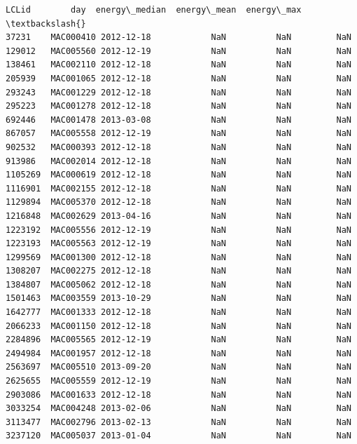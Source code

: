 \documentclass[11pt]{article}
\makeatletter
\newcommand{\boxspacing}{\kern\kvtcb@left@rule\kern\kvtcb@boxsep}
\newcommand{\prompt}[4]{
        {\ttfamily\llap{{\color{#2}[#3]:\hspace{3pt}#4}}\vspace{-\baselineskip}}
    }
\makeatother
\begin{document}
            \begin{tcolorbox}[breakable, size=fbox, boxrule=.5pt, pad at break*=1mm, opacityfill=0]
\prompt{Out}{outcolor}{30}{\boxspacing}
\begin{Verbatim}[commandchars=\\\{\}]
             LCLid        day  energy\_median  energy\_mean  energy\_max  \textbackslash{}
37231    MAC000410 2012-12-18            NaN          NaN         NaN
129012   MAC005560 2012-12-19            NaN          NaN         NaN
138461   MAC002110 2012-12-18            NaN          NaN         NaN
205939   MAC001065 2012-12-18            NaN          NaN         NaN
293243   MAC001229 2012-12-18            NaN          NaN         NaN
295223   MAC001278 2012-12-18            NaN          NaN         NaN
692446   MAC001478 2013-03-08            NaN          NaN         NaN
867057   MAC005558 2012-12-19            NaN          NaN         NaN
902532   MAC000393 2012-12-18            NaN          NaN         NaN
913986   MAC002014 2012-12-18            NaN          NaN         NaN
1105269  MAC000619 2012-12-18            NaN          NaN         NaN
1116901  MAC002155 2012-12-18            NaN          NaN         NaN
1129894  MAC005370 2012-12-18            NaN          NaN         NaN
1216848  MAC002629 2013-04-16            NaN          NaN         NaN
1223192  MAC005556 2012-12-19            NaN          NaN         NaN
1223193  MAC005563 2012-12-19            NaN          NaN         NaN
1299569  MAC001300 2012-12-18            NaN          NaN         NaN
1308207  MAC002275 2012-12-18            NaN          NaN         NaN
1384807  MAC005062 2012-12-18            NaN          NaN         NaN
1501463  MAC003559 2013-10-29            NaN          NaN         NaN
1642777  MAC001333 2012-12-18            NaN          NaN         NaN
2066233  MAC001150 2012-12-18            NaN          NaN         NaN
2284896  MAC005565 2012-12-19            NaN          NaN         NaN
2494984  MAC001957 2012-12-18            NaN          NaN         NaN
2563697  MAC005510 2013-09-20            NaN          NaN         NaN
2625655  MAC005559 2012-12-19            NaN          NaN         NaN
2903086  MAC001633 2012-12-18            NaN          NaN         NaN
3033254  MAC004248 2013-02-06            NaN          NaN         NaN
3113477  MAC002796 2013-02-13            NaN          NaN         NaN
3237120  MAC005037 2013-01-04            NaN          NaN         NaN


\end{Verbatim}
\end{tcolorbox}
\end{document}
